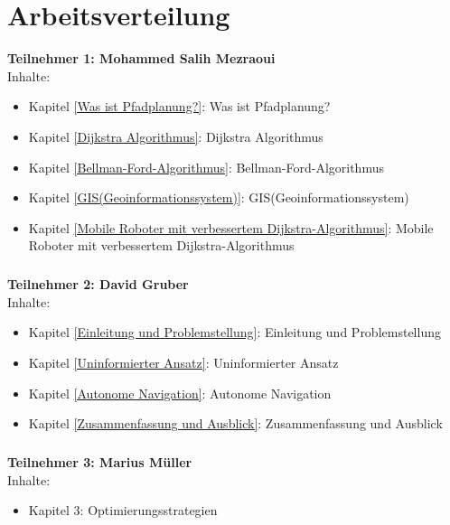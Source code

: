 \chapter*{Arbeitsverteilung}

\textbf{Teilnehmer 1: Mohammed Salih Mezraoui} 
\\
 Inhalte:
 \begin{itemize}
    \item Kapitel \ref{Was ist Pfadplanung?}: Was ist Pfadplanung?
    \item Kapitel \ref{Dijkstra Algorithmus}: Dijkstra Algorithmus
    \item Kapitel \ref{Bellman-Ford-Algorithmus}: Bellman-Ford-Algorithmus
    \item Kapitel \ref{GIS(Geoinformationssystem)}: GIS(Geoinformationssystem)
    \item Kapitel \ref{Mobile Roboter mit verbessertem Dijkstra-Algorithmus}: Mobile Roboter mit verbessertem Dijkstra-Algorithmus
\end{itemize}
\paragraph*{}
\textbf{Teilnehmer 2: David Gruber} 
\\
Inhalte: 
\begin{itemize}
    \item Kapitel \ref{Einleitung und Problemstellung}: Einleitung und Problemstellung
    \item Kapitel \ref{Uninformierter Ansatz}: Uninformierter Ansatz
    \item Kapitel \ref{Autonome Navigation}: Autonome Navigation
    \item Kapitel \ref{Zusammenfassung und Ausblick}: Zusammenfassung und Ausblick
\end{itemize}
\paragraph*{}
\textbf{Teilnehmer 3: Marius Müller} 
\\
 Inhalte: 
\begin{itemize}
	\item Kapitel 3: Optimierungsstrategien
\end{itemize}